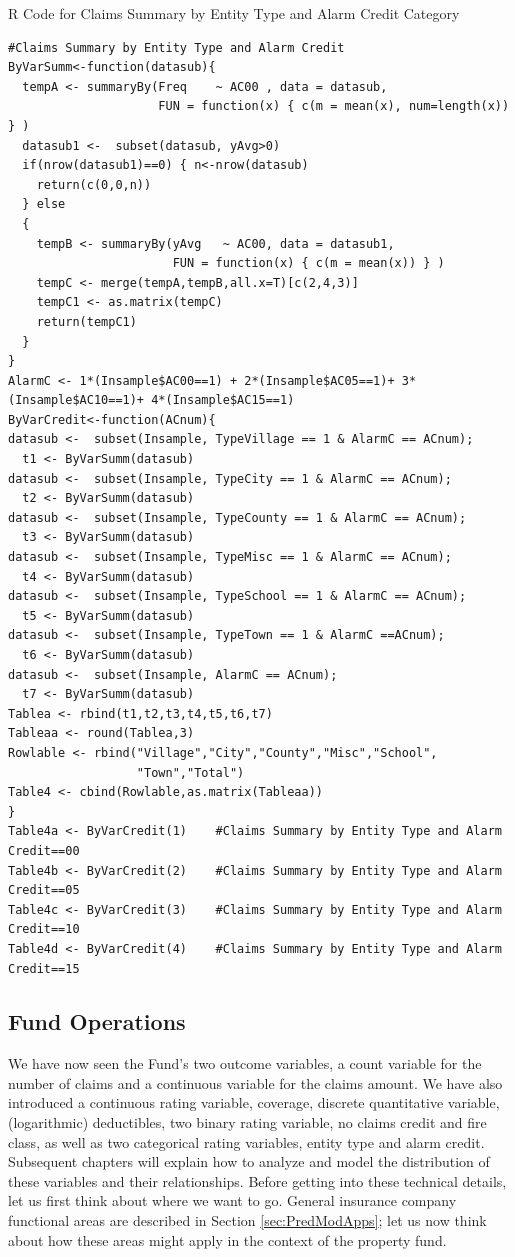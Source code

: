 \documentclass[]{book}
\theoremstyle{definition}
\theoremstyle{definition}
\theoremstyle{definition}
\theoremstyle{remark}
\begin{document}
R Code for Claims Summary by Entity Type and Alarm Credit Category

\hypertarget{display.RateAlarmCredit.2}{}
\begin{verbatim}
#Claims Summary by Entity Type and Alarm Credit
ByVarSumm<-function(datasub){
  tempA <- summaryBy(Freq    ~ AC00 , data = datasub,   
                     FUN = function(x) { c(m = mean(x), num=length(x)) } )
  datasub1 <-  subset(datasub, yAvg>0)
  if(nrow(datasub1)==0) { n<-nrow(datasub)
    return(c(0,0,n))
  } else 
  {
    tempB <- summaryBy(yAvg   ~ AC00, data = datasub1,
                       FUN = function(x) { c(m = mean(x)) } )
    tempC <- merge(tempA,tempB,all.x=T)[c(2,4,3)]
    tempC1 <- as.matrix(tempC)
    return(tempC1)
  }
}
AlarmC <- 1*(Insample$AC00==1) + 2*(Insample$AC05==1)+ 3*(Insample$AC10==1)+ 4*(Insample$AC15==1)
ByVarCredit<-function(ACnum){
datasub <-  subset(Insample, TypeVillage == 1 & AlarmC == ACnum); 
  t1 <- ByVarSumm(datasub)
datasub <-  subset(Insample, TypeCity == 1 & AlarmC == ACnum);      
  t2 <- ByVarSumm(datasub)
datasub <-  subset(Insample, TypeCounty == 1 & AlarmC == ACnum);   
  t3 <- ByVarSumm(datasub)
datasub <-  subset(Insample, TypeMisc == 1 & AlarmC == ACnum);
  t4 <- ByVarSumm(datasub)
datasub <-  subset(Insample, TypeSchool == 1 & AlarmC == ACnum);    
  t5 <- ByVarSumm(datasub)
datasub <-  subset(Insample, TypeTown == 1 & AlarmC ==ACnum);      
  t6 <- ByVarSumm(datasub)
datasub <-  subset(Insample, AlarmC == ACnum);  
  t7 <- ByVarSumm(datasub)
Tablea <- rbind(t1,t2,t3,t4,t5,t6,t7)
Tableaa <- round(Tablea,3)
Rowlable <- rbind("Village","City","County","Misc","School",
                  "Town","Total")
Table4 <- cbind(Rowlable,as.matrix(Tableaa))
}
Table4a <- ByVarCredit(1)    #Claims Summary by Entity Type and Alarm Credit==00
Table4b <- ByVarCredit(2)    #Claims Summary by Entity Type and Alarm Credit==05 
Table4c <- ByVarCredit(3)    #Claims Summary by Entity Type and Alarm Credit==10
Table4d <- ByVarCredit(4)    #Claims Summary by Entity Type and Alarm Credit==15
\end{verbatim}

\subsection{Fund Operations}\label{fund-operations}

We have now seen the Fund's two outcome variables, a count variable for
the number of claims and a continuous variable for the claims amount. We
have also introduced a continuous rating variable, coverage, discrete
quantitative variable, (logarithmic) deductibles, two binary rating
variable, no claims credit and fire class, as well as two categorical
rating variables, entity type and alarm credit. Subsequent chapters will
explain how to analyze and model the distribution of these variables and
their relationships. Before getting into these technical details, let us
first think about where we want to go. General insurance company
functional areas are described in Section \ref{sec:PredModApps}; let us
now think about how these areas might apply in the context of the
property fund.
\end{document}
